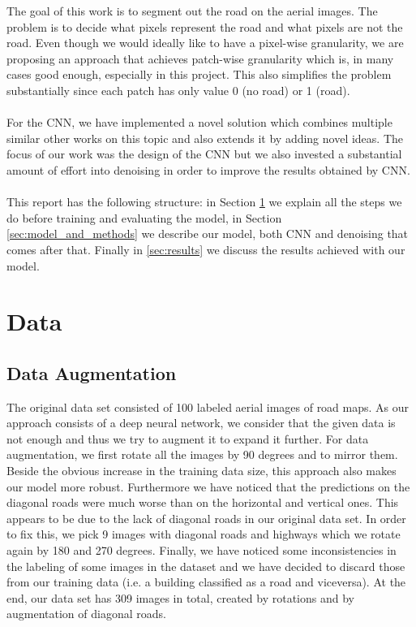 \documentclass[10pt,conference,compsocconf]{IEEEtran}
\begin{document}
The goal of this work is to segment out the road on the aerial images. The problem is to decide what pixels
represent the road and what pixels are not the road. Even though we would ideally like to have a pixel-wise
granularity, we are proposing an approach that achieves patch-wise granularity which is, in many cases good enough,
especially in this project. This also simplifies the problem substantially since each patch has only value 0 (no road) or 1 (road). \\
\\
For the CNN, we have implemented a novel solution which combines multiple similar other works on this topic 
and also extends it by adding novel ideas. The focus of our work was the design of the
CNN but we also invested a substantial amount of effort into denoising in order
to improve the results obtained by CNN.\\
\\
This report has the following structure: in Section \ref{sec:Data} we explain all the steps we do before training
and evaluating the model, in Section \ref{sec:model_and_methods} we describe our model, both CNN and denoising
that comes after that. Finally in \ref{sec:results} we discuss the results achieved with our model.


\section{Data}
\label{sec:Data}

\subsection{Data Augmentation}
\label{sec:data_aug}
The original data set consisted of 100 labeled aerial images of road maps. As our approach consists of a
deep neural network, we consider that the given data is not enough and thus we try to augment it to expand it further.
For data augmentation, we first rotate all the images by 90 degrees and to mirror them. Beside the obvious increase
in the training data size, this approach also makes our model more robust. Furthermore we have noticed that the 
predictions on the diagonal roads were much worse than on the horizontal and vertical ones. This appears to be due to
the lack of diagonal roads in our original data set. In order to fix this, we pick 9 images with diagonal
roads and highways which we rotate again by 180 and 270 degrees. Finally, we have noticed some inconsistencies
in the labeling of some images  in the dataset and we have decided to discard those from our training data (i.e. a building classified as a road and viceversa). At the end, our data set has 309 images in total, created by rotations and by augmentation of diagonal roads.
\end{document}
